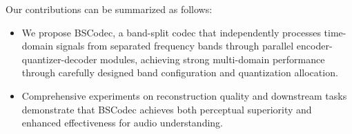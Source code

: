 \documentclass[11pt]{article}
\begin{document}
Our contributions can be summarized as follows:
\begin{itemize}
    \item We propose BSCodec, a band-split codec that independently processes time-domain signals from separated frequency bands through parallel encoder-quantizer-decoder modules, achieving strong multi-domain performance through carefully designed band configuration and quantization allocation.
    
    \item Comprehensive experiments on reconstruction quality and downstream tasks demonstrate that BSCodec achieves both perceptual superiority and enhanced effectiveness for audio understanding.

    
\end{itemize}

\end{document}
